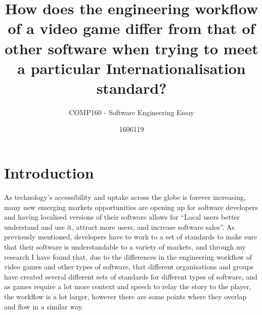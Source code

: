 \documentclass{scrartcl}
\title{How does the engineering workflow of a video game differ from that of other software when trying to meet a particular Internationalisation standard?}
\subtitle{COMP160 - Software Engineering Essay}
\author{1606119}
\begin{document}
\maketitle


\section{Introduction}


As technology's accessibility and uptake across the globe is forever increasing, many new emerging markets opportunities are opening up for software developers and having localised versions of their software allows for ``Local users better understand and use it, attract more users, and increase software sales''\cite{6601827}. As previously mentioned, developers have to work to a set of standards to make sure that their software is understandable to a variety of markets, and through my research I have found that, due to the differences in the engineering workflow of video games and other types of software, that different organisations and groups have created several different sets of standards for different types of software, and as games require a lot more context and speech to relay the story to the player, the workflow is a lot larger, however there are some points where they overlap and flow in a similar way. 
\end{document}
